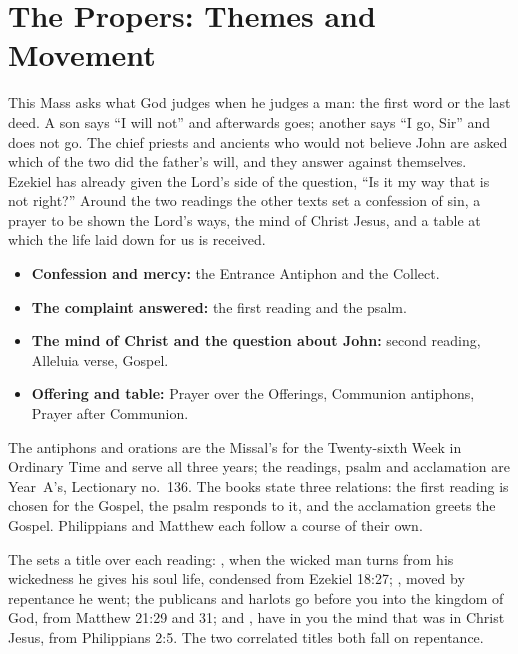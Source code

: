 
\section{The Propers: Themes and Movement}

This Mass asks what God judges when he judges a man: the first word or the last
deed. A son says ``I will not'' and afterwards goes; another says ``I go, Sir''
and does not go. The chief priests and ancients who would not believe John are
asked which of the two did the father's will, and they answer against
themselves. Ezekiel has already given the Lord's side of the question, ``Is it
my way that is not right?'' Around the two readings the other texts set a
confession of sin, a prayer to be shown the Lord's ways, the mind of Christ
Jesus, and a table at which the life laid down for us is received.

\begin{itemize}[leftmargin=1.2em,itemsep=0pt,topsep=.3em]
\item \textbf{Confession and mercy:} the Entrance Antiphon and the Collect.
\item \textbf{The complaint answered:} the first reading and the psalm.
\item \textbf{The mind of Christ and the question about John:} second reading,
Alleluia verse, Gospel.
\item \textbf{Offering and table:} Prayer over the Offerings, Communion
antiphons, Prayer after Communion.
\end{itemize}

The antiphons and orations are the Missal's for the Twenty-sixth Week in
Ordinary Time and serve all three years; the readings,
psalm and acclamation are Year~A's, Lectionary no.~136. The books state three
relations: the first reading is chosen for the Gospel, the psalm responds to
it, and the acclamation greets the Gospel. Philippians and Matthew each follow
a course of their own.

The  sets a title over each reading: , when the wicked man turns from his wickedness he gives his soul
life, condensed from Ezekiel 18:27; , moved by repentance he
went; the publicans and harlots go before you into the kingdom of God, from
Matthew 21:29 and 31; and ,
have in you the mind that was in Christ Jesus, from Philippians 2:5.
The two correlated titles both fall on repentance.

